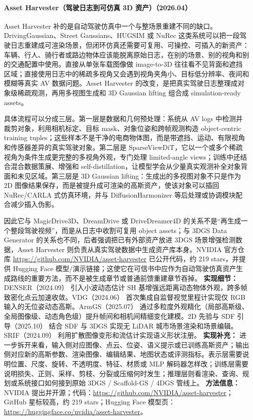 \paragraph{Asset Harvester（驾驶日志到可仿真 3D 资产）（2026.04）\cite{2604_18468}}
Asset Harvester 补的是自动驾驶仿真中一个与整场景重建不同的缺口。DrivingGaussian、Street Gaussians、HUGSIM 或 NuRec 这类系统可以把一段驾驶日志重建成可渲染场景，但闭环仿真还需要可复用、可操控、可插入的新资产：车辆、行人、骑行者或路边物体应该能脱离原始日志，在别的场景、别的视角和别的交通配置中使用。直接从单张车载图像做 image-to-3D 往往看不见背面和遮挡区域；直接使用日志中的稀疏多视角又会遇到视角夹角小、目标低分辨率、夜间和模糊等真实 AV 数据问题。Asset Harvester 的改变，是把真实驾驶日志整理成对象级稀疏观测，再用多视图生成和 3D Gaussian lifting 组合成 simulation-ready assets。

具体流程可以分成三层。第一层是数据和几何预处理：系统从 AV logs 中检测并裁剪对象，利用相机标定、目标 mask、对象位姿和跨帧观测构造 object-centric training tuples；这些样本不是干净的电商物体图，而是带遮挡、运动、有限视角和传感器差异的真实驾驶对象。第二层是 SparseViewDiT，它以一个或多个稀疏视角为条件生成更完整的多视角外观，专门处理 limited-angle views；训练中还结合混合数据策展、增强和 self-distillation，让模型学会从少量真实观测补全对象背面和未见区域。第三层是 3D Gaussian lifting：生成出的多视图对象不只是作为 2D 图像结果保存，而是被提升成可渲染的高斯资产，使该对象可以插回 NuRec/CARLA 式仿真环境，并与 DiffusionHarmonizer 等后处理或协调模块配合减少插入伪影。

因此它与 MagicDrive3D、DreamDrive 或 DriveDreamer4D 的关系不是“再生成一个整段驾驶视频”，而是从日志中收割可复用 object assets；与 3DGS Data Generator 的关系也不同，后者强调把已有外部资产放进 3DGS 场景增强检测数据，Asset Harvester 则负责从真实驾驶数据中生成资产库本身。NVIDIA 官方仓库 \url{https://github.com/NVIDIA/asset-harvester} 已公开代码，约 219 stars，并提供 Hugging Face 模型/演示链接；这使它在可信书中应作为自动驾驶仿真资产生成路线的重要方法，而不是被生成章节或普通前馈重建章节吞掉。
\textbf{实现细节：} DENSER（2024.09） 引入小波动态估计 SH 基增强远距离动态物体外观，跨多帧致密化点云加速收敛。VDG（2024.06） 首次集成自监督视觉里程计实现仅 RGB 输入的无位姿动态高斯。ArmGS（2025.07） 通过多粒度外观精化（局部高斯级、全局图像级、动态角色级）提升帧间和相机间精细变化建模。2D 先验与 SDF 引导（2025.10） 结合 SDF 与 3DGS 实现无 LiDAR 城市场景渲染和场景编辑。SRIF（2024.09） 利用扩散图像变形和流估计实现语义形状注册。
\textbf{实现补充：} 进一步拆开来看，输入侧对应图像、点云、位姿、语义提示或已训练高斯资产；输出侧对应新的高斯参数、渲染图像、编辑结果、地图状态或评测指标。表示层需要说明位置、尺度、旋转、不透明度、特征、材质或 MLP 解码器怎样改；训练层需要说明损失、正则、采样、剪枝、分裂或压缩何时发生；推理层则看渲染、查询、规划或系统接口如何接到原始 3DGS / Scaffold-GS / 4DGS 管线上。
\textbf{方法信息：} NVIDIA 提出并开源；代码：\url{https://github.com/NVIDIA/asset-harvester}；GitHub 星标较高，约 219 stars；Hugging Face 模型页：\url{https://huggingface.co/nvidia/asset-harvester}。
